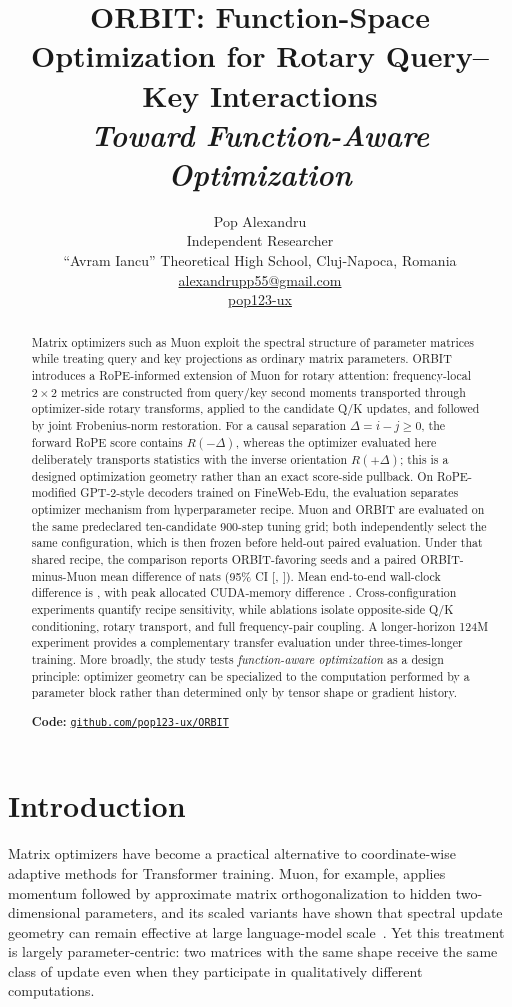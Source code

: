 \documentclass[10pt]{article}
\title{ORBIT: Function-Space Optimization for Rotary Query--Key Interactions\\[0.35em]\large\itshape Toward Function-Aware Optimization}
\author{Pop Alexandru\\[-0.1em]\small Independent Researcher\\[-0.1em]\small ``Avram Iancu'' Theoretical High School, Cluj-Napoca, Romania\\[-0.1em]\small \href{mailto:alexandrupp55@gmail.com}{alexandrupp55@gmail.com}\\[-0.1em]\small \href{https://github.com/pop123-ux}{\faGithub\;pop123-ux}}
\date{}
\begin{document}
\maketitle
{}

\begin{abstract}
Matrix optimizers such as Muon exploit the spectral structure of parameter matrices while
treating query and key projections as ordinary matrix parameters. ORBIT introduces a
RoPE-informed extension of Muon for rotary attention: frequency-local $2\times2$ metrics
are constructed from query/key second moments transported through optimizer-side rotary
transforms, applied to the candidate Q/K updates, and followed by joint Frobenius-norm
restoration. For a causal separation $\Delta=i-j\ge0$, the forward RoPE score contains
$R(-\Delta)$, whereas the optimizer evaluated here deliberately transports statistics with
the inverse orientation $R(+\Delta)$; this is a designed optimization geometry rather than
an exact score-side pullback. On RoPE-modified GPT-2-style decoders trained on FineWeb-Edu,
the evaluation separates optimizer mechanism from hyperparameter recipe. Muon and ORBIT are
evaluated on the same predeclared ten-candidate 900-step tuning grid; both independently
select the same configuration, which is then frozen before held-out paired evaluation.
Under that shared recipe, the comparison reports \MatchedWins{} ORBIT-favoring seeds and a
paired ORBIT-minus-Muon mean difference of \MatchedDelta{} nats (95\% CI
[\MatchedCILow{}, \MatchedCIHigh{}]). Mean end-to-end wall-clock difference is
\MatchedRuntimeOverhead{}, with peak allocated CUDA-memory difference
\MatchedMemoryOverhead{}. Cross-configuration experiments quantify recipe sensitivity,
while ablations isolate opposite-side Q/K conditioning, rotary transport, and full
frequency-pair coupling. A longer-horizon 124M experiment provides a complementary transfer
evaluation under three-times-longer training. More broadly, the study tests
\emph{function-aware optimization} as a design principle: optimizer geometry can be
specialized to the computation performed by a parameter block rather than determined only
by tensor shape or gradient history.

\smallskip
\noindent\textbf{Code:} \href{https://github.com/pop123-ux/ORBIT}{\texttt{github.com/pop123-ux/ORBIT}}
\end{abstract}

\section{Introduction}
Matrix optimizers have become a practical alternative to coordinate-wise adaptive methods
for Transformer training. Muon, for example, applies momentum followed by approximate
matrix orthogonalization to hidden two-dimensional parameters, and its scaled variants have
shown that spectral update geometry can remain effective at large language-model
scale~\cite{jordan2024muon,liu2025muon}. Yet this treatment is largely parameter-centric:
two matrices with the same shape receive the same class of update even when they participate
in qualitatively different computations.
\end{document}
